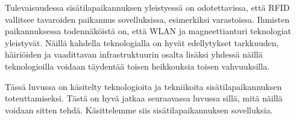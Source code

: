 Tulevaisuudessa sisätilapaikannuksen yleistyessä on odotettavissa, että RFID vallitsee tavaroiden paikannus sovelluksissa, esimerkiksi varastoissa. Ihmisten paikannuksessa todennäköistä on, että WLAN ja magneettianturi teknologiat yleistyvät. Näillä kahdella teknologialla on hyvät edellytykset tarkkuuden, häiriöiden ja vaadittavan infrastruktuurin osalta lisäksi yhdessä näillä teknologioilla voidaan täydentää toisen heikkouksia toisen vahvuuksilla.

Tässä luvussa on käsitelty teknologioita ja tekniikoita sisätilapaikannuksen toteuttamiseksi. Tästä on hyvä jatkaa seuraavassa luvussa sillä, mitä näillä voidaan sitten tehdä. Käsittelemme siis sisätilapaikannuksen sovelluksia.



